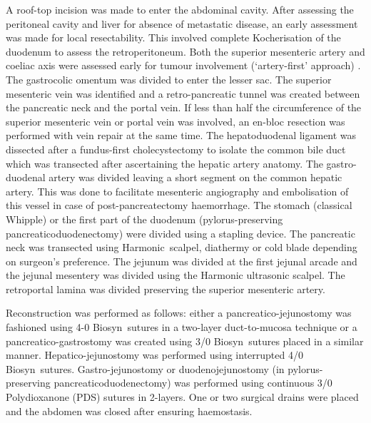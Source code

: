 A roof-top incision was made to enter the abdominal cavity. 
After assessing the peritoneal cavity and liver for absence of metastatic disease, an early assessment was made for local resectability. 
This involved complete Kocherisation of the duodenum to assess the retroperitoneum. 
Both the superior mesenteric artery and coeliac axis were assessed early for tumour involvement (‘artery-first’ approach) \parencite{weitz_artery_2010}. 
The gastrocolic omentum was divided to enter the lesser sac. 
The superior mesenteric vein was identified and a retro-pancreatic tunnel was created between the pancreatic neck and the portal vein. 
If less than half the circumference of the superior mesenteric vein or portal vein was involved, an en-bloc resection was performed with vein repair at the same time. 
The hepatoduodenal ligament was dissected after a fundus-first cholecystectomy to isolate the common bile duct which was transected after ascertaining the hepatic artery anatomy. 
The gastro-duodenal artery was divided leaving a short segment on the common hepatic artery. 
This was done to facilitate mesenteric angiography and embolisation of this vessel in case of post-pancreatectomy haemorrhage. 
The stomach (classical Whipple) or the first part of the duodenum (pylorus-preserving pancreaticoduodenectomy) were divided using a stapling device. 
The pancreatic neck was transected using Harmonic\texttrademark\ scalpel, diathermy or cold blade depending on surgeon's preference. 
The jejunum was divided at the first jejunal arcade and the jejunal mesentery was divided using the Harmonic ultrasonic scalpel. 
The retroportal lamina was divided preserving the superior mesenteric artery. 

Reconstruction was performed as follows: either a pancreatico-jejunostomy was fashioned using 4-0 Biosyn\texttrademark\ sutures in a two-layer duct-to-mucosa technique or a pancreatico-gastrostomy was created using 3/0 Biosyn\texttrademark\ sutures placed in a similar manner. 
Hepatico-jejunostomy was performed using interrupted 4/0 Biosyn\texttrademark\ sutures.
Gastro-jejunostomy or duodenojejunostomy (in pylorus-preserving pancreaticoduodenectomy) was performed using continuous 3/0 Polydioxanone (PDS\texttrademark) sutures in 2-layers. 
One or two surgical drains were placed and the abdomen was closed after ensuring haemostasis.


